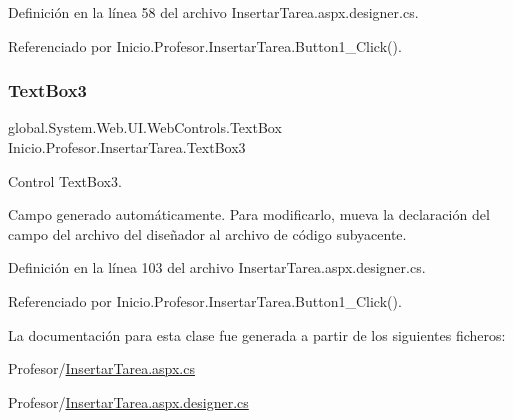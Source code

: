 Definición en la línea 58 del archivo Insertar\+Tarea.\+aspx.\+designer.\+cs.



Referenciado por Inicio.\+Profesor.\+Insertar\+Tarea.\+Button1\+\_\+\+Click().

\mbox{\label{classInicio_1_1Profesor_1_1InsertarTarea_ac391e2a8a6bed6d1092a989c712391a2}} 
\subsubsection{\texorpdfstring{TextBox3}{TextBox3}}
{\footnotesize\ttfamily global.\+System.\+Web.\+U\+I.\+Web\+Controls.\+Text\+Box Inicio.\+Profesor.\+Insertar\+Tarea.\+Text\+Box3\hspace{0.3cm}{\ttfamily [protected]}}



Control Text\+Box3. 

Campo generado automáticamente. Para modificarlo, mueva la declaración del campo del archivo del diseñador al archivo de código subyacente. 

Definición en la línea 103 del archivo Insertar\+Tarea.\+aspx.\+designer.\+cs.



Referenciado por Inicio.\+Profesor.\+Insertar\+Tarea.\+Button1\+\_\+\+Click().



La documentación para esta clase fue generada a partir de los siguientes ficheros\+:\begin{DoxyCompactItemize}
\item 
Profesor/\mbox{\hyperlink{InsertarTarea_8aspx_8cs}{Insertar\+Tarea.\+aspx.\+cs}}\item 
Profesor/\mbox{\hyperlink{InsertarTarea_8aspx_8designer_8cs}{Insertar\+Tarea.\+aspx.\+designer.\+cs}}\end{DoxyCompactItemize}
